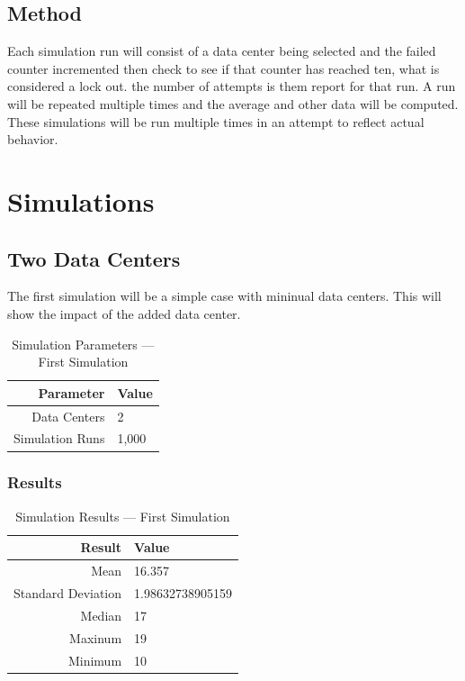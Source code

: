 \documentclass[11pt, letterpaper]{article}
\begin{document}
\subsection{Method}
Each simulation run will consist of a data center being selected and the
failed counter incremented then check to see if that counter has reached
ten, what is considered a lock out. the number of attempts is them report
for that run. A run will be repeated multiple times and the average and
other data will be computed. These simulations will be run multiple times in an
attempt to reflect actual behavior.


\section{Simulations}
\subsection{Two Data Centers}
The first simulation will be a simple case with mininual data centers. This will
show the impact of the added data center.

\begin{table}[H]
	\centering
	\caption{Simulation Parameters --- First Simulation}
	\begin{tabular}{||r|l||}
		\hline \hline
		Parameter & Value \\ \hline \hline
		Data Centers & 2 \\ \hline
		Simulation Runs & 1,000 \\ \hline \hline
	\end{tabular}
	\label{tab:Sim1_set}
\end{table}


\subsubsection*{Results}
\begin{table}[H]
	\centering
	\caption{Simulation Results --- First Simulation}
	\begin{tabular}{||r|l||}
		\hline \hline
		Result                  & Value                     \\ \hline \hline
		Mean                    & 16.357    \\ \hline
		Standard Deviation      & 1.98632738905159    \\ \hline
		Median                  & 17    \\ \hline
		Maxinum                 & 19    \\ \hline
		Minimum                 & 10    \\ \hline \hline
	\end{tabular}
	\label{tab:Sim1_res}
\end{table}
\end{document}
